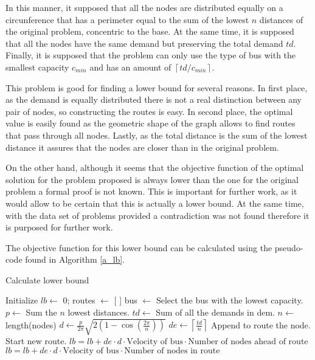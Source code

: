 \documentclass[10pt,twoside]{article}
\begin{document}
In this manner, it supposed that all the nodes are distributed equally
on a circunference that has a perimeter equal to the sum of the lowest
$n$ distances of the original problem, concentric to the base. At the
same time, it is supposed that all the nodes have the same demand but
preserving the total demand $td$. Finally, it is supposed that the
problem can only use the type of bus with the smallest capacity
$c_{min}$ and has an amount of $\left \lceil{td/c_{min}} \right \rceil$.

This problem is good for finding a lower bound for several reasons. In
first place, as the demand is equally distributed there is not a real
distinction between any pair of nodes, so constructing the routes is
easy. In second place, the optimal value is easily found as the
geometric shape of the graph allows to find routes that pass through
all nodes. Lastly, as the total distance is the sum of the lowest
distance it assures that the nodes are closer than in the original
problem.

On the other hand, although it seems that the objective function of
the optimal solution for the problem proposed is always lower than the
one for the original problem a formal proof is not known. This is
important for further work, as it would allow to be certain that this
is actually a lower bound. At the same time, with the data set of
problems provided a contradiction was not found therefore it is
purposed for further work.

The objective function for this lower bound can be calculated using the pseudo-code found in Algorithm \ref{a_lb}.

\begin{algorithm}[H]
  \caption{Calculate lower bound} \label{a_lb}
  \begin{algorithmic}[1]
      \State Initialize $lb \gets$ 0; routes $\gets$ [ ]
      \State bus $\gets$ Select the bus with the lowest capacity.
      \State $p \gets$ Sum the $n$ lowest distances.
      \State $td \gets$ Sum of all the demands in dem.
      \State $n \gets$ length(nodes)
      \State $d \gets \frac{p}{2\pi}\sqrt{2(1 - \cos{\left(\frac{2\pi}{n}\right)})}$
      \State $de \gets \left \lceil{\frac{td}{n}} \right \rceil$
          \State Append to route the node.
          \Else
          \State Start new route.
        \EndIf
      \EndFor
          \State $lb = lb + de \cdot d \cdot \text{Velocity of bus} \cdot \text{Number of nodes ahead of route}$
        \EndFor
        \State $lb = lb + de \cdot d \cdot \text{Velocity of bus} \cdot \text{Number of nodes in route}$
      \EndFor
    \EndProcedure
  \end{algorithmic}

\end{algorithm}
\end{document}
